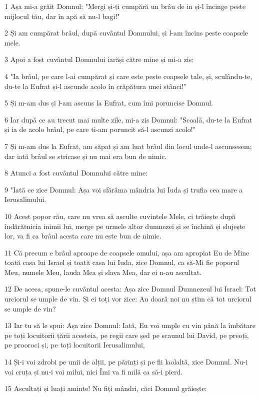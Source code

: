 \par 1 Așa mi-a grăit Domnul: "Mergi și-ți cumpără un brâu de in și-l încinge peste mijlocul tău, dar în apă să nu-l bagi!"
\par 2 Și am cumpărat brâul, după cuvântul Domnului, și l-am încins peste coapsele mele.
\par 3 Apoi a fost cuvântul Domnului iarăși către mine și mi-a zis:
\par 4 "Ia brâul, pe care l-ai cumpărat și care este peste coapsele tale, și, sculându-te, du-te la Eufrat și-l ascunde acolo în crăpătura unei stânci!"
\par 5 Și m-am dus și l-am ascuns la Eufrat, cum îmi poruncise Domnul.
\par 6 Iar după ce au trecut mai multe zile, mi-a zis Domnul: "Scoală, du-te la Eufrat și ia de acolo brâul, pe care ti-am poruncit să-l ascunzi acolo!"
\par 7 Și m-am dus la Eufrat, am săpat și am luat brâul din locul unde-l ascunsesem; dar iată brâul se stricase și nu mai era bun de nimic.
\par 8 Atunci a fost cuvântul Domnului către mine:
\par 9 "Iată ce zice Domnul: Așa voi sfărâma mândria lui Iuda și trufia cea mare a Ierusalimului.
\par 10 Acest popor rău, care nu vrea să asculte cuvintele Mele, ci trăiește după îndărătnicia inimii lui, merge pe urmele altor dumnezei și se închină și slujește lor, va fi ca brâul acesta care nu este bun de nimic.
\par 11 Că precum e brâul aproape de coapsele omului, așa am apropiat Eu de Mine toată casa lui Israel și toată casa lui Iuda, zice Domnul, ca să-Mi fie poporul Meu, numele Meu, lauda Mea și slava Mea, dar ei n-au ascultat.
\par 12 De aceea, spune-le cuvântul acesta: Așa zice Domnul Dumnezeul lui Israel: Tot urciorul se umple de vin. Și ei toți vor zice: Au doară noi nu știm că tot urciorul se umple de vin?
\par 13 Iar tu să le spui: Așa zice Domnul: Iată, Eu voi umple cu vin până la îmbătare pe toți locuitorii țării acesteia, pe regii care șed pe scaunul lui David, pe preoți, pe prooroci și, pe toți locuitorii Ierusalimului,
\par 14 Și-i voi zdrobi pe unii de alții, pe părinți și pe fii laolaltă, zice Domnul. Nu-i voi cruța și nu-i voi milui, nici Îmi va fi milă ca să-i pierd.
\par 15 Ascultați și luați aminte! Nu fiți mândri, căci Domnul grăiește:
